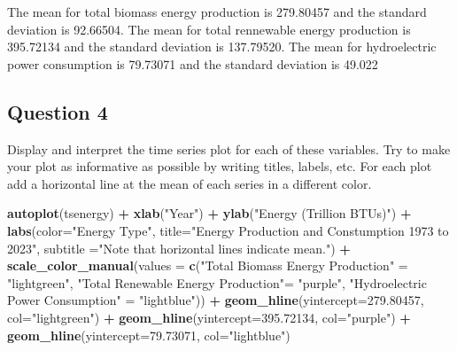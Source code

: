 \documentclass[
]{article}
\newenvironment{Shaded}{\begin{snugshade}}{\end{snugshade}}
\newcommand{\AttributeTok}[1]{\textcolor[rgb]{0.13,0.29,0.53}{#1}}
\newcommand{\FloatTok}[1]{\textcolor[rgb]{0.00,0.00,0.81}{#1}}
\newcommand{\FunctionTok}[1]{\textcolor[rgb]{0.13,0.29,0.53}{\textbf{#1}}}
\newcommand{\NormalTok}[1]{#1}
\newcommand{\OtherTok}[1]{\textcolor[rgb]{0.56,0.35,0.01}{#1}}
\newcommand{\SpecialCharTok}[1]{\textcolor[rgb]{0.81,0.36,0.00}{\textbf{#1}}}
\newcommand{\StringTok}[1]{\textcolor[rgb]{0.31,0.60,0.02}{#1}}
\begin{document}
The mean for total biomass energy production is 279.80457 and the
standard deviation is 92.66504. The mean for total rennewable energy
production is 395.72134 and the standard deviation is 137.79520. The
mean for hydroelectric power consumption is 79.73071 and the standard
deviation is 49.022

\hypertarget{question-4}{%
\subsection{Question 4}\label{question-4}}

Display and interpret the time series plot for each of these variables.
Try to make your plot as informative as possible by writing titles,
labels, etc. For each plot add a horizontal line at the mean of each
series in a different color.

\begin{Shaded}
\begin{Highlighting}[]
\FunctionTok{autoplot}\NormalTok{(tsenergy) }\SpecialCharTok{+}
  \FunctionTok{xlab}\NormalTok{(}\StringTok{"Year"}\NormalTok{) }\SpecialCharTok{+}
  \FunctionTok{ylab}\NormalTok{(}\StringTok{"Energy (Trillion BTUs)"}\NormalTok{) }\SpecialCharTok{+}
  \FunctionTok{labs}\NormalTok{(}\AttributeTok{color=}\StringTok{"Energy Type"}\NormalTok{, }\AttributeTok{title=}\StringTok{"Energy Production and Constumption 1973 to 2023"}\NormalTok{, }\AttributeTok{subtitle =}\StringTok{"Note that horizontal lines indicate mean."}\NormalTok{) }\SpecialCharTok{+}
  \FunctionTok{scale\_color\_manual}\NormalTok{(}\AttributeTok{values =} \FunctionTok{c}\NormalTok{(}\StringTok{"Total Biomass Energy Production"} \OtherTok{=} \StringTok{"lightgreen"}\NormalTok{, }\StringTok{"Total Renewable Energy Production"}\OtherTok{=} \StringTok{"purple"}\NormalTok{, }\StringTok{"Hydroelectric Power Consumption"} \OtherTok{=} \StringTok{"lightblue"}\NormalTok{)) }\SpecialCharTok{+}
                       \FunctionTok{geom\_hline}\NormalTok{(}\AttributeTok{yintercept=}\FloatTok{279.80457}\NormalTok{, }\AttributeTok{col=}\StringTok{"lightgreen"}\NormalTok{) }\SpecialCharTok{+}
  \FunctionTok{geom\_hline}\NormalTok{(}\AttributeTok{yintercept=}\FloatTok{395.72134}\NormalTok{, }\AttributeTok{col=}\StringTok{"purple"}\NormalTok{) }\SpecialCharTok{+}
  \FunctionTok{geom\_hline}\NormalTok{(}\AttributeTok{yintercept=}\FloatTok{79.73071}\NormalTok{, }\AttributeTok{col=}\StringTok{"lightblue"}\NormalTok{) }
\end{Highlighting}
\end{Shaded}
\end{document}
